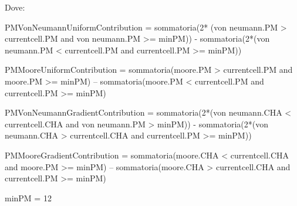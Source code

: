 Dove:


PMVonNeumannUniformContribution = sommatoria(2* (von neumann.PM > currentcell.PM and von neumann.PM >= minPM)) - sommatoria(2*(von neumann.PM < currentcell.PM and currentcell.PM >= minPM))

PMMooreUniformContribution = sommatoria(moore.PM > currentcell.PM and moore.PM >= minPM) – sommatoria(moore.PM < currentcell.PM and currentcell.PM >= minPM)

PMVonNeumannGradientContribution = sommatoria(2*(von neumann.CHA < currentcell.CHA and von neumann.PM > minPM)) - sommatoria(2*(von neumann.CHA > currentcell.CHA and currentcell.PM >= minPM))

PMMooreGradientContribution = sommatoria(moore.CHA < currentcell.CHA and moore.PM >= minPM) – sommatoria(moore.CHA > currentcell.CHA and currentcell.PM >= minPM)

minPM = 12
